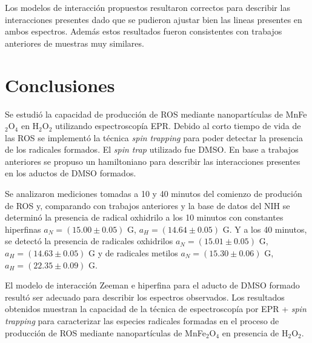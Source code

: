 \documentclass[aps,prl,reprint,superscriptaddress,showkeys]{revtex4-2}
\begin{document}
Los modelos de interacción propuestos resultaron correctos para describir las interacciones presentes dado que se pudieron ajustar bien las lineas presentes en ambos espectros. Además estos resultados fueron consistentes con trabajos anteriores de muestras muy similares. 

\section{Conclusiones}

Se estudió la capacidad de producción de ROS mediante nanopartículas de MnFe$_2$O$_4$ en H$_2$O$_2$ utilizando espectroscopía EPR. Debido al corto tiempo de vida de las ROS se implementó la técnica \textit{spin trapping} para poder detectar la presencia de los radicales formados. El \textit{spin trap} utilizado fue DMSO. En base a trabajos anteriores se propuso un hamiltoniano para describir las interacciones presentes en los aductos de DMSO formados. 

Se analizaron mediciones tomadas a 10 y 40 minutos del comienzo de produción de ROS y, comparando con trabajos anteriores y la base de datos del NIH se determinó la presencia de radical oxhidrilo a los 10 minutos con constantes hiperfinas $a_N = (15.00 \pm 0.05)$ G, $a_H =  (14.64 \pm 0.05)$ G. Y a los 40 minutos, se detectó la presencia de radicales oxhidrilos $a_N = (15.01 \pm 0.05)$ G, $a_H = (14.63 \pm 0.05)$ G y de radicales metilos $a_N = (15.30 \pm 0.06)$ G, $a_H = (22.35 \pm 0.09)$ G. 

El modelo de interacción Zeeman e hiperfina para el aducto de DMSO formado resultó ser adecuado para describir los espectros observados. Los resultados obtenidos muestran la capacidad de la técnica de espectroscopía por EPR + \textit{spin trapping} para caracterizar las especies radicales formadas en el proceso de producción de ROS mediante nanopartículas de MnFe$_2$O$_4$ en presencia de H$_2$O$_2$.




\end{document}
